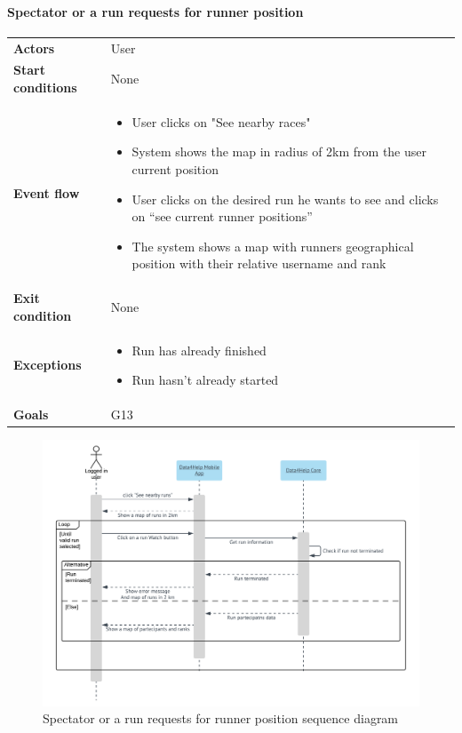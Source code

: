 \newpage
\paragraph{Spectator or a run requests for runner position}
\begin{center}
\begin{table}[H]
\centering
\begin{tabular}{l|p{}}
\textbf{Actors} & User \\
\textbf{Start conditions} & None \\
\textbf{Event flow}  & \begin{minipage}[t]{0.7\textwidth}
    \begin{itemize}
       \item User clicks on "See nearby races"
\item System shows the map in radius of 2km from the user current position
\item User clicks on the desired run he wants to see and clicks on “see current runner positions”
\item The system shows a map with runners geographical position with their relative username and rank


    \end{itemize}
    
\end{minipage}  \\
\textbf{Exit condition} & None \\
\textbf{Exceptions} & \begin{minipage}[t]{0.7\textwidth}
    \begin{itemize}
       \item Run has already finished
\item Run hasn't already started


    \end{itemize}
    
\end{minipage}  \\
\textbf{Goals} & G13 
\end{tabular}

\end{table}
\end{center}

\begin{figure}[H]
  \includegraphics[width=\textwidth,height=\textheight,keepaspectratio]{assets/sequence/SpectatorOfARunRequestsForRunnerPosition.pdf}
  \caption{Spectator or a run requests for runner position sequence diagram}
  \label{fig:SpectatorOfARunRequestsForRunnerPosition}
\end{figure}

